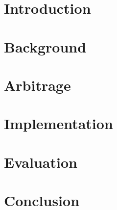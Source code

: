 

\newenvironment{Figure}
  {\par\medskip\noindent\minipage{\linewidth}}
  {\endminipage\par\medskip}


\begin{abstract}
    
\end{abstract}

\section{Introduction}\label{intro}


\section{Background}\label{back}


\section{Arbitrage}\label{arb}


\section{Implementation}\label{imp}


\section{Evaluation}\label{eval}


\section{Conclusion}\label{con}


\newpage
\printbibliography

